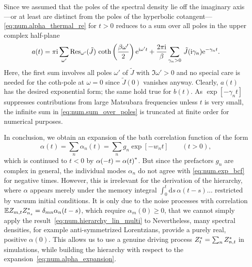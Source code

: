 Since we assumed that the poles of the spectral density lie off the imaginary axis---or at least are distinct from the poles of the hyperbolic cotangent---\autoref{eq:num.alpha_thermal_re} for $t > 0$ reduces to a sum over all poles in the upper complex half-plane
\begin{equation}
  a(t) = \pi\ii \sum_{\omega'} \Res_{\omega'}(\tilde J) \, \coth \left(\frac{\beta \omega'}{2}\right) \exp[\ii\omega' t]
  + \frac{2\pi\ii}{\beta}\sum_{\gamma_n > 0}  \, \tilde J(\ii\gamma_n) \exp[-\gamma_n t].
  \label{eq:num.sum_over_poles}
\end{equation}
Here, the first sum involves all poles $\omega'$ of $\tilde J$ with $\Im \omega' > 0$ and no special care is needed for the coth-pole at $\omega = 0$ since $\tilde J(0)$ vanishes anyway.
Clearly, $a(t)$ has the desired exponential form; the same hold true for $b(t)$.
As $\exp[-\gamma_n t]$ suppresses contributions from large Matsubara frequencies unless $t$ is very small, the infinite sum in \autoref{eq:num.sum_over_poles} is truncated at finite order for numerical purposes.


In conclusion, we obtain an expansion of the bath correlation function of the form
\begin{equation}
  \alpha(t) = \sum_n \alpha_n(t) = \sum_n g_n \exp[-w_n t] \qquad (t > 0),
  \label{eq:num.alpha_expansion}
\end{equation}
which is continued to $t < 0$ by $\alpha(-t) = {\alpha(t)}^*$.
But since the prefactors $g_n$ are complex in general, the individual modes $\alpha_n$ do not agree with \autoref{eq:num.exp_bcf} for negative times.
However, this is irrelevant for the derivation of the hierarchy, where $\alpha$ appears merely under the memory integral $\int_0^t \mathrm{d}s \, \alpha(t-s)\dots$ restricted by vacuum initial conditions.
It is only due to the noise processes with correlation $\E Z_{m,t}\ZZ_{n_s} = \delta_{mn}\alpha_n(t - s)$, which require $\alpha_m(0) \ge 0$, that we cannot simply apply the result~\ref{eq:num.hierarchy_lin_multi} to
Nevertheless, many spectral densities, for example anti-symmetrized Lorentzians, provide a purely real, positive $\alpha(0)$.
This allows us to use a genuine driving process ${Z}^*_t = \sum_n {Z}^*_{n, t}$ in simulations, while building the hierarchy with respect to the expansion~\ref{eq:num.alpha_expansion}.



